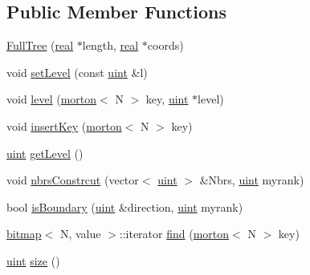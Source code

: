 \subsection*{Public Member Functions}
\begin{DoxyCompactItemize}
\item 
\mbox{\hyperlink{classFullTree_a7e91df045a1e04bb4d749d67300a1c3b}{Full\+Tree}} (\mbox{\hyperlink{definitions_8h_aedc0ad84d1e764530814f57ad931d02a}{real}} $\ast$length, \mbox{\hyperlink{definitions_8h_aedc0ad84d1e764530814f57ad931d02a}{real}} $\ast$coords)
\item 
void \mbox{\hyperlink{classFullTree_a1f880ec827fcd885759f6eafc76048be}{set\+Level}} (const \mbox{\hyperlink{definitions_8h_a69aa29b598b851b0640aa225a9e5d61d}{uint}} \&l)
\item 
void \mbox{\hyperlink{classFullTree_a2aadfbda309e246642550044712f98a0}{level}} (\mbox{\hyperlink{definitions_8h_af8682350bd8bb38ee9023f7a0a310add}{morton}}$<$ N $>$ key, \mbox{\hyperlink{definitions_8h_a69aa29b598b851b0640aa225a9e5d61d}{uint}} $\ast$level)
\item 
void \mbox{\hyperlink{classFullTree_abce6ea3ea3393373f32a5b7ccfcac976}{insert\+Key}} (\mbox{\hyperlink{definitions_8h_af8682350bd8bb38ee9023f7a0a310add}{morton}}$<$ N $>$ key)
\item 
\mbox{\hyperlink{definitions_8h_a69aa29b598b851b0640aa225a9e5d61d}{uint}} \mbox{\hyperlink{classFullTree_abed32a809a754eab0ae47257da1863b4}{get\+Level}} ()
\item 
void \mbox{\hyperlink{classFullTree_ade3b60e3f3622a49edb5b7a88e348667}{nbrs\+Constrcut}} (vector$<$ \mbox{\hyperlink{definitions_8h_a69aa29b598b851b0640aa225a9e5d61d}{uint}} $>$ \&Nbrs, \mbox{\hyperlink{definitions_8h_a69aa29b598b851b0640aa225a9e5d61d}{uint}} myrank)
\item 
bool \mbox{\hyperlink{classFullTree_acb1eec16a6b73e2a465b7a32319fe4f6}{is\+Boundary}} (\mbox{\hyperlink{definitions_8h_a69aa29b598b851b0640aa225a9e5d61d}{uint}} \&direction, \mbox{\hyperlink{definitions_8h_a69aa29b598b851b0640aa225a9e5d61d}{uint}} myrank)
\item 
\mbox{\hyperlink{definitions_8h_acf2396ef4de9eb8a6324b9f1a624ea85}{bitmap}}$<$ N, value $>$\+::iterator \mbox{\hyperlink{classFullTree_ad0432afb277be83e79d33e1a748648a3}{find}} (\mbox{\hyperlink{definitions_8h_af8682350bd8bb38ee9023f7a0a310add}{morton}}$<$ N $>$ key)
\item 
\mbox{\hyperlink{definitions_8h_a69aa29b598b851b0640aa225a9e5d61d}{uint}} \mbox{\hyperlink{classFullTree_a13bb6b68dea0e36255dbd7b057110806}{size}} ()

\end{DoxyCompactItemize}
